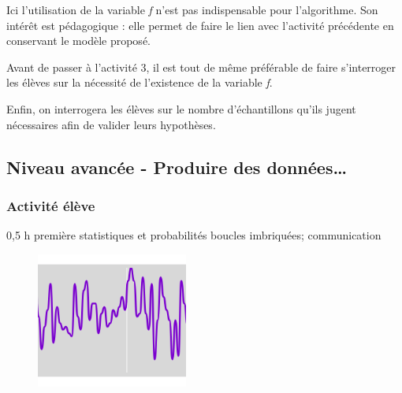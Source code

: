 \begin{remarque}
    Ici l'utilisation de la variable \emph{f} n'est pas indispensable pour l'algorithme. Son intérêt est pédagogique : elle permet de faire le lien avec l'activité précédente en conservant le modèle proposé.

   Avant de passer à l'activité 3, il est tout de même préférable de faire s'interroger les élèves sur la nécessité de l'existence de la variable \emph{f}.
   
   Enfin, on interrogera les élèves sur le nombre d'échantillons qu'ils jugent nécessaires afin de valider leurs hypothèses.
\end{remarque}


%
%

\newpage

\subsection{Niveau avancée - Produire des données\ldots}

\subsubsection{Activité élève}

\cartouche
{0,5 h}         %
{première}           %
{statistiques et probabilités}        %
{}     %
{boucles imbriquées; communication}       %


\begin{figure}
    \includegraphics[width=\linewidth]{res/mb-fluctuation-activite3-illus.png}
\end{figure}

